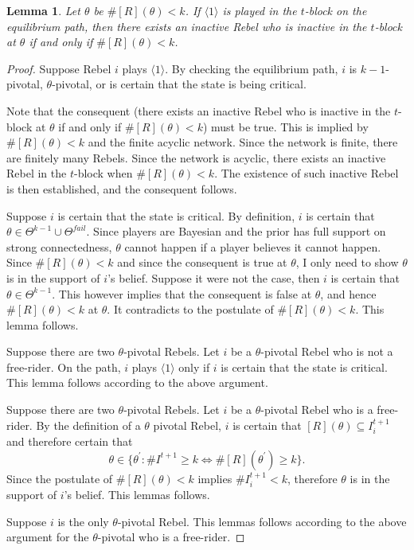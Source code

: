 \documentclass[12pt,letter]{article}
\newtheorem{lemma}{Lemma}[section]
\theoremstyle{definition}
\theoremstyle{definition}
\theoremstyle{remark}
\theoremstyle{claim}
\begin{document}
\begin{lemma} Let $\theta$ be $\#[R](\theta)< k$. If $\langle 1 \rangle$ is played in the $t$-block on the equilibrium path, then there exists an inactive Rebel who is inactive in the $t$-block at $\theta$ if and only if $\#[R](\theta)<k$.
\end{lemma}
\begin{proof}
Suppose Rebel $i$ plays $\langle 1 \rangle$. By checking the equilibrium path, $i$ is $k-1$-pivotal, $\theta$-pivotal, or is certain that the state is being critical. 

Note that the consequent (there exists an inactive Rebel who is inactive in the $t$-block at $\theta$ if and only if $\#[R](\theta)<k$) must be true. This is implied by $\#[R](\theta)<k$ and the finite acyclic network. Since the network is finite, there are finitely many Rebels. Since the network is acyclic, there exists an inactive Rebel in the $t$-block when $\#[R](\theta)<k$. The existence of such inactive Rebel is then established, and the consequent follows.

Suppose $i$ is certain that the state is critical. By definition, $i$ is certain that $\theta\in \Theta^{k-1}\cup\Theta^{fail}$. Since players are Bayesian and the prior has full support on strong connectedness, $\theta$ cannot happen if a player believes it cannot happen. Since $\#[R](\theta)<k$ and since the consequent is true at $\theta$, I only need to show $\theta$ is in the support of $i$'s belief. Suppose it were not the case, then $i$ is certain that $\theta\in \Theta^{k-1}$. This however implies that the consequent is false at $\theta$, and hence $\#[R](\theta)<k$ at $\theta$. It contradicts to the postulate of $\#[R](\theta)<k$. This lemma follows.

Suppose there are two $\theta$-pivotal Rebels. Let $i$ be a $\theta$-pivotal Rebel who is not a free-rider. On the path, $i$ plays $\langle 1 \rangle$ only if $i$ is certain that the state is critical. This lemma follows according to the above argument.

Suppose there are two $\theta$-pivotal Rebels. Let $i$ be a $\theta$-pivotal Rebel who is a free-rider. By the definition of a $\theta$ pivotal Rebel, $i$ is certain that $[R](\theta)\subseteq I^{t+1}_i$ and therefore certain that \[\theta\in\{\theta^{'}:\#I^{t+1}\geq k \Leftrightarrow \#[R](\theta^{'})\geq k\}.\] Since the postulate of $\#[R](\theta)<k$ implies $\#I^{t+1}_i<k$, therefore $\theta$ is in the support of $i$'s belief. This lemmas follows. 

Suppose $i$ is the only $\theta$-pivotal Rebel. This lemmas follows according to the above argument for the $\theta$-pivotal who is a free-rider.

\end{proof}
\end{document}
